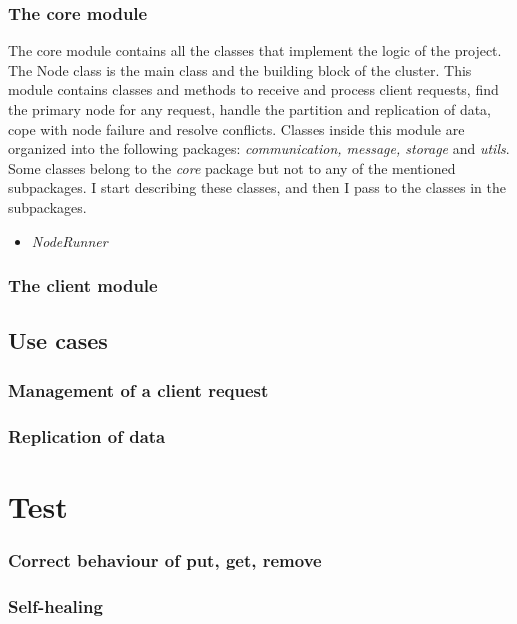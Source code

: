 \documentclass{article}
\begin{document}
\subsubsection{The core module} 
The core module contains all the classes that implement the logic of the project. The Node class is the main class and the building block of the cluster. This module contains classes and methods to receive and process client requests, find the primary node for any request, handle the partition and replication of data, cope with node failure and resolve conflicts. Classes inside this module are organized into the following packages: \textit{communication, message, storage} and \textit{utils}. Some classes belong to the \textit{core} package but not to any of the mentioned subpackages. I start describing these classes, and then I pass to the classes in the subpackages. \\
\begin{itemize}
\item \textit{NodeRunner}
\end{itemize}


\subsubsection{The client module} 

\subsection{Use cases} 

\subsubsection{Management of a client request} 

\subsubsection{Replication of data} 

\section{Test}

\subsubsection{Correct behaviour of put, get, remove} 

\subsubsection{Self-healing } 
\end{document}
